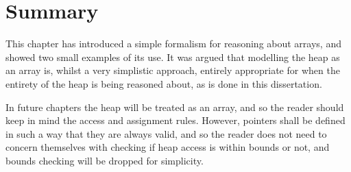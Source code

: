 \section{Summary}
\label{sec:heap-summary}

This chapter has introduced a simple formalism for reasoning about
arrays, and showed two small examples of its use. It was argued that
modelling the heap as an array is, whilst a very simplistic approach,
entirely appropriate for when the entirety of the heap is being
reasoned about, as is done in this dissertation.

In future chapters the heap will be treated as an array, and so the
reader should keep in mind the access and assignment rules. However,
pointers shall be defined in such a way that they are always valid,
and so the reader does not need to concern themselves with checking if
heap access is within bounds or not, and bounds checking will be
dropped for simplicity.
